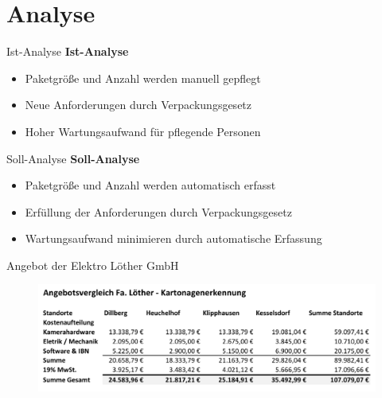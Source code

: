 \documentclass[10pt,ngerman]{beamer}
\begin{document}



\section{Analyse}
\begin{frame}[fragile]{Ist-Analyse}
  \textbf{Ist-Analyse}
  \begin{itemize}
    \item Paketgröße und Anzahl werden manuell gepflegt
          \pause
    \item Neue Anforderungen durch  Verpackungsgesetz
          \pause
    \item Hoher Wartungsaufwand für pflegende Personen
  \end{itemize}
\end{frame}


\begin{frame}[fragile]{Soll-Analyse}
  \textbf{Soll-Analyse}
  \begin{itemize}
    \item Paketgröße und Anzahl werden automatisch erfasst
          \pause
    \item Erfüllung der Anforderungen durch Verpackungsgesetz
          \pause
    \item Wartungsaufwand minimieren durch automatische Erfassung
  \end{itemize}
\end{frame}


\begin{frame}[fragile]{Angebot der Elektro Löther GmbH}
  \begin{figure}[htpb]
    \centering
    \includegraphics[width=1\textwidth]{pics/AngebotLoether.png}
  \end{figure}
\end{frame}
\end{document}
